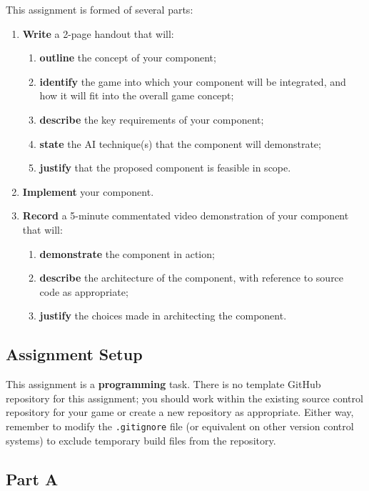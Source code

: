 \documentclass{../../fal_assignment}
\begin{document}
This assignment is formed of several parts:
\begin{enumerate}[label=(\Alph*)]
	\item \textbf{Write} a 2-page handout that will:
		\begin{enumerate}[label=(\roman*)]
			\item \textbf{outline} the concept of your component;
			\item \textbf{identify} the game into which your component will be integrated, and how it will fit into
				the overall game concept;
			\item \textbf{describe} the key requirements of your component;
			\item \textbf{state} the AI technique(s) that the component will demonstrate;
			\item \textbf{justify} that the proposed component is feasible in scope.
		\end{enumerate}
	\item \textbf{Implement} your component.
	\item \textbf{Record} a 5-minute commentated video demonstration of your component that will:
		\begin{enumerate}[label=(\roman*)]
			\item \textbf{demonstrate} the component in action;
			\item \textbf{describe} the architecture of the component, with reference to source code as appropriate;
			\item \textbf{justify} the choices made in architecting the component.
		\end{enumerate}
\end{enumerate}

\subsection*{Assignment Setup}

This assignment is a \textbf{programming} task.
There is no template GitHub repository for this assignment;
you should work within the existing source control repository for your game
or create a new repository as appropriate.
Either way, remember to modify the \texttt{.gitignore} file (or equivalent on other version control systems) to exclude temporary build files
from the repository.

\subsection*{Part A}
\end{document}
